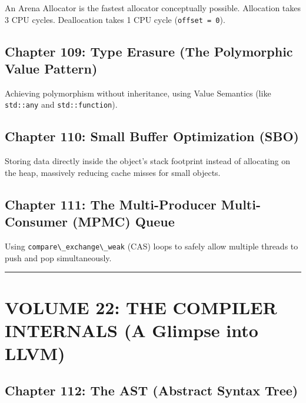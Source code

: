 An Arena Allocator is the fastest allocator conceptually possible.
Allocation takes 3 CPU cycles. Deallocation takes 1 CPU cycle
(\passthrough{\lstinline!offset = 0!}).

\hypertarget{chapter-109-type-erasure-the-polymorphic-value-pattern}{%
\subsection{Chapter 109: Type Erasure (The Polymorphic Value
Pattern)}\label{chapter-109-type-erasure-the-polymorphic-value-pattern}}

Achieving polymorphism without inheritance, using Value Semantics (like
\passthrough{\lstinline!std::any!} and
\passthrough{\lstinline!std::function!}).

\hypertarget{chapter-110-small-buffer-optimization-sbo}{%
\subsection{Chapter 110: Small Buffer Optimization
(SBO)}\label{chapter-110-small-buffer-optimization-sbo}}

Storing data directly inside the object's stack footprint instead of
allocating on the heap, massively reducing cache misses for small
objects.

\hypertarget{chapter-111-the-multi-producer-multi-consumer-mpmc-queue}{%
\subsection{Chapter 111: The Multi-Producer Multi-Consumer (MPMC)
Queue}\label{chapter-111-the-multi-producer-multi-consumer-mpmc-queue}}

Using \passthrough{\lstinline!compare\_exchange\_weak!} (CAS) loops to
safely allow multiple threads to push and pop simultaneously.

\begin{center}\rule{0.5\linewidth}{0.5pt}\end{center}

\hypertarget{volume-22-the-compiler-internals-a-glimpse-into-llvm}{%
\section{VOLUME 22: THE COMPILER INTERNALS (A Glimpse into
LLVM)}\label{volume-22-the-compiler-internals-a-glimpse-into-llvm}}

\hypertarget{chapter-112-the-ast-abstract-syntax-tree}{%
\subsection{Chapter 112: The AST (Abstract Syntax
Tree)}\label{chapter-112-the-ast-abstract-syntax-tree}}

